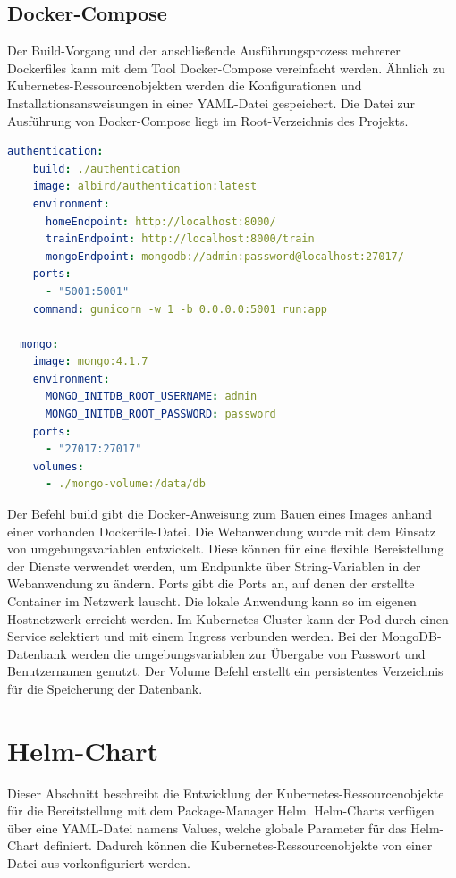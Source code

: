 \subsection{Docker-Compose}

Der Build-Vorgang und der anschließende Ausführungsprozess mehrerer Dockerfiles kann mit dem Tool Docker-Compose vereinfacht werden.
Ähnlich zu Kubernetes-Ressourcenobjekten werden die Konfigurationen und Installationsansweisungen in einer YAML-Datei gespeichert.
Die Datei zur Ausführung von Docker-Compose liegt im Root-Verzeichnis des Projekts.

\begin{lstlisting}[caption={Ausschnit aus dem docker-compose.yaml},captionpos=b ,label={lst:docker-compose.yaml},language=yaml,float,floatplacement=H]
  authentication:
    build: ./authentication
    image: albird/authentication:latest
    environment:
      homeEndpoint: http://localhost:8000/
      trainEndpoint: http://localhost:8000/train 
      mongoEndpoint: mongodb://admin:password@localhost:27017/
    ports:
      - "5001:5001"
    command: gunicorn -w 1 -b 0.0.0.0:5001 run:app

  mongo:
    image: mongo:4.1.7
    environment:
      MONGO_INITDB_ROOT_USERNAME: admin
      MONGO_INITDB_ROOT_PASSWORD: password
    ports:
      - "27017:27017"
    volumes:
      - ./mongo-volume:/data/db
\end{lstlisting}

Der Befehl build gibt die Docker-Anweisung zum Bauen eines Images anhand einer vorhanden Dockerfile-Datei.
Die Webanwendung wurde mit dem Einsatz von umgebungsvariablen entwickelt.
Diese können für eine flexible Bereistellung der Dienste verwendet werden, um Endpunkte über String-Variablen in der Webanwendung zu ändern.
Ports gibt die Ports an, auf denen der erstellte Container im Netzwerk lauscht.
Die lokale Anwendung kann so im eigenen Hostnetzwerk erreicht werden.
Im Kubernetes-Cluster kann der Pod durch einen Service selektiert und mit einem Ingress verbunden werden.
Bei der MongoDB-Datenbank werden die umgebungsvariablen zur Übergabe von Passwort und Benutzernamen genutzt.
Der Volume Befehl erstellt ein persistentes Verzeichnis für die Speicherung der Datenbank.


\section{Helm-Chart}\label{helmcharts}
Dieser Abschnitt beschreibt die Entwicklung der Kubernetes-Ressourcenobjekte für die Bereitstellung mit dem Package-Manager Helm.
Helm-Charts verfügen über eine YAML-Datei namens Values, welche globale Parameter für das Helm-Chart definiert.
Dadurch können die Kubernetes-Ressourcenobjekte von einer Datei aus vorkonfiguriert werden.



